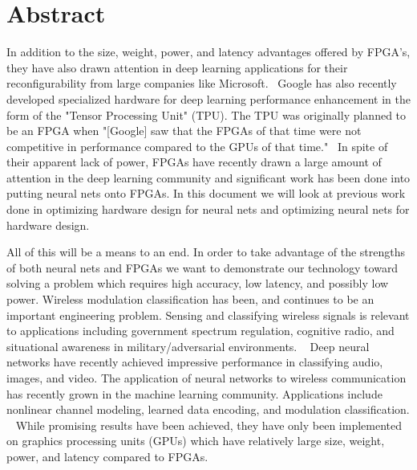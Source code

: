 \section{Abstract}
In addition to the size, weight, power, and latency advantages offered by FPGA's, they have also drawn attention in deep learning applications for their reconfigurability from large companies like Microsoft.~\cite{Putnam:2014:RFA:2665671.2665678} Google has also recently developed specialized hardware for deep learning performance enhancement in the form of the "Tensor Processing Unit" (TPU).  The TPU was originally planned to be an FPGA when "[Google] saw that the FPGAs of that time were not competitive in performance compared to the GPUs of that time."~\cite{DBLP:journals/corr/JouppiYPPABBBBB17}  In spite of their apparent lack of power, FPGAs have recently drawn a large amount of attention in the deep learning community and significant work has been done into putting neural nets onto FPGAs.  In this document we will look at previous work done in optimizing hardware design for neural nets and optimizing neural nets for hardware design.  

All of this will be a means to an end.  In order to take advantage of the strengths of both neural nets and FPGAs we want to demonstrate our technology toward solving a problem which requires high accuracy, low latency, and possibly low power.
Wireless modulation classification has been, and continues to be an important engineering problem.  
Sensing and classifying wireless signals is relevant to applications including government spectrum regulation, cognitive radio, and situational awareness in military/adversarial environments.  ~\cite{DBLP:journals/corr/RajendranCFBCGP17}  Deep neural networks have recently achieved impressive performance in classifying audio, images, and video.  The application of neural networks to wireless communication has recently grown in the machine learning community.  Applications include nonlinear channel modeling, learned data encoding, and modulation classification.  ~\cite{DBLP:journals/corr/OSheaH17}  While promising results have been achieved, they have only been implemented on graphics processing units (GPUs) which have relatively large size, weight, power, and latency compared to FPGAs. ~\cite{Nurvitadhi:2017:FBG:3020078.3021740} 
